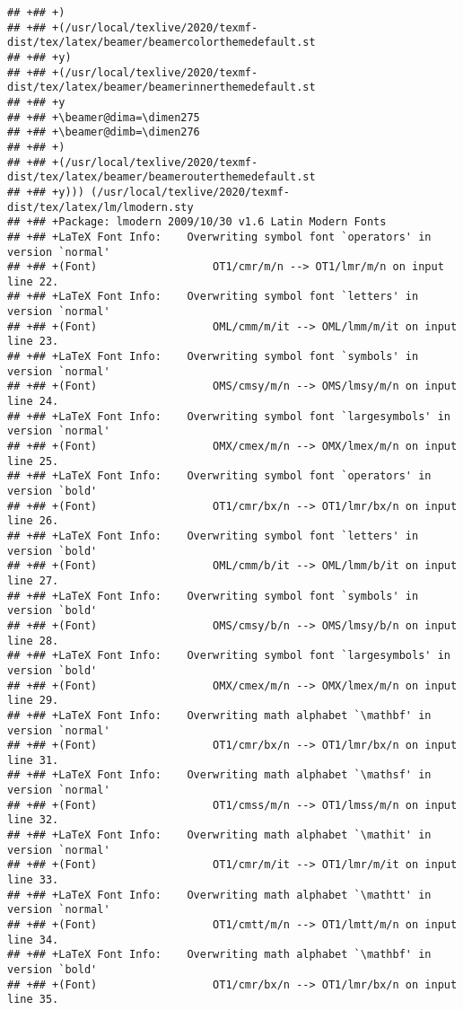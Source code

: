 \documentclass[ignorenonframetext,]{beamer}
\begin{document}
\begin{verbatim}
## +## +)
## +## +(/usr/local/texlive/2020/texmf-dist/tex/latex/beamer/beamercolorthemedefault.st
## +## +y)
## +## +(/usr/local/texlive/2020/texmf-dist/tex/latex/beamer/beamerinnerthemedefault.st
## +## +y
## +## +\beamer@dima=\dimen275
## +## +\beamer@dimb=\dimen276
## +## +)
## +## +(/usr/local/texlive/2020/texmf-dist/tex/latex/beamer/beamerouterthemedefault.st
## +## +y))) (/usr/local/texlive/2020/texmf-dist/tex/latex/lm/lmodern.sty
## +## +Package: lmodern 2009/10/30 v1.6 Latin Modern Fonts
## +## +LaTeX Font Info:    Overwriting symbol font `operators' in version `normal'
## +## +(Font)                  OT1/cmr/m/n --> OT1/lmr/m/n on input line 22.
## +## +LaTeX Font Info:    Overwriting symbol font `letters' in version `normal'
## +## +(Font)                  OML/cmm/m/it --> OML/lmm/m/it on input line 23.
## +## +LaTeX Font Info:    Overwriting symbol font `symbols' in version `normal'
## +## +(Font)                  OMS/cmsy/m/n --> OMS/lmsy/m/n on input line 24.
## +## +LaTeX Font Info:    Overwriting symbol font `largesymbols' in version `normal'
## +## +(Font)                  OMX/cmex/m/n --> OMX/lmex/m/n on input line 25.
## +## +LaTeX Font Info:    Overwriting symbol font `operators' in version `bold'
## +## +(Font)                  OT1/cmr/bx/n --> OT1/lmr/bx/n on input line 26.
## +## +LaTeX Font Info:    Overwriting symbol font `letters' in version `bold'
## +## +(Font)                  OML/cmm/b/it --> OML/lmm/b/it on input line 27.
## +## +LaTeX Font Info:    Overwriting symbol font `symbols' in version `bold'
## +## +(Font)                  OMS/cmsy/b/n --> OMS/lmsy/b/n on input line 28.
## +## +LaTeX Font Info:    Overwriting symbol font `largesymbols' in version `bold'
## +## +(Font)                  OMX/cmex/m/n --> OMX/lmex/m/n on input line 29.
## +## +LaTeX Font Info:    Overwriting math alphabet `\mathbf' in version `normal'
## +## +(Font)                  OT1/cmr/bx/n --> OT1/lmr/bx/n on input line 31.
## +## +LaTeX Font Info:    Overwriting math alphabet `\mathsf' in version `normal'
## +## +(Font)                  OT1/cmss/m/n --> OT1/lmss/m/n on input line 32.
## +## +LaTeX Font Info:    Overwriting math alphabet `\mathit' in version `normal'
## +## +(Font)                  OT1/cmr/m/it --> OT1/lmr/m/it on input line 33.
## +## +LaTeX Font Info:    Overwriting math alphabet `\mathtt' in version `normal'
## +## +(Font)                  OT1/cmtt/m/n --> OT1/lmtt/m/n on input line 34.
## +## +LaTeX Font Info:    Overwriting math alphabet `\mathbf' in version `bold'
## +## +(Font)                  OT1/cmr/bx/n --> OT1/lmr/bx/n on input line 35.

\end{verbatim}
\end{document}
